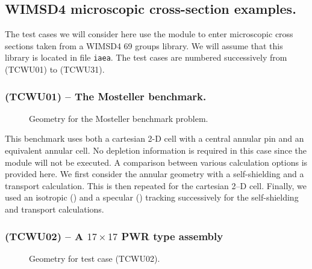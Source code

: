 \subsection{WIMSD4 microscopic cross-section examples.}\label{sect:ExWWIMSD4} 

The test cases we will consider here use the  module to enter
microscopic cross sections taken from a WIMSD4 69 groups library. We will assume
that this library is located in file {\tt iaea}. The test cases are numbered
successively from \tst(TCWU01) to \tst(TCWU31). 


\subsubsection{\tst(TCWU01) -- The Mosteller benchmark.}

\begin{figure}[h!]  
\begin{center} 
\epsfxsize=5cm \centerline{ }
\parbox{14cm}{\caption{Geometry for the  Mosteller
benchmark problem.}\label{fig:TCWU01}}   
\end{center}  
\end{figure}

This benchmark uses both a cartesian 2-D cell with a central annular pin and an
equivalent annular cell.\cite{Mostel} No depletion information is required in
this case since the module  will not be executed. A comparison between
various calculation options is provided here. We first consider the annular
geometry with a  self-shielding and a  transport
calculation. This is then repeated for the cartesian 2--D cell. Finally, we used
an isotropic () and a specular ()  tracking
successively for the self-shielding and transport calculations.


\subsubsection{\tst(TCWU02) -- A $17\times 17$ PWR type assembly}

\begin{figure}[h!]  
\begin{center} 
\epsfxsize=12cm \centerline{ }
\parbox{14cm}{\caption{Geometry for test case \tst(TCWU02).}\label{fig:TCWU02}}
\end{center}  
\end{figure}

